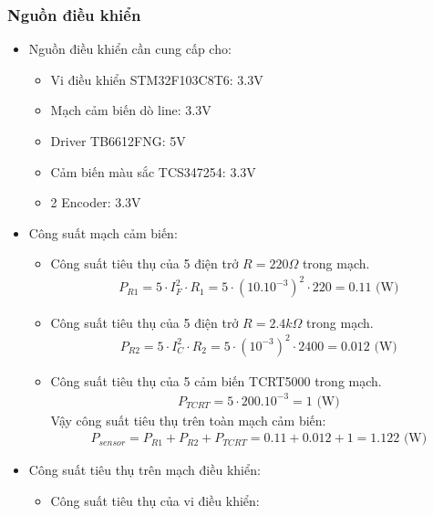             \subsubsection{Nguồn điều khiển}
                \begin{itemize}
                    \item Nguồn điều khiển cần cung cấp cho:
                    \begin{itemize}
                        \item Vi điều khiển STM32F103C8T6: 3.3V
                        \item Mạch cảm biến dò line: 3.3V
                        \item Driver TB6612FNG: 5V
                        \item Cảm biến màu sắc TCS347254: 3.3V
                        \item 2 Encoder: 3.3V
                    \end{itemize}
                    \item Công suất mạch cảm biến:
                    \begin{itemize}
                        \item Công suất tiêu thụ của 5 điện trở $R = 220 \Omega$ trong mạch. \\
                        \begin{align*}
                            P_{R1} = 5 \cdot I_{F}^2 \cdot R_1 = 5 \cdot (10.10^{-3})^2 \cdot 220 = 0.11 \text{ (W)}
                        \end{align*}
                        \item Công suất tiêu thụ của 5 điện trở $R = 2.4 k\Omega$ trong mạch. \\
                        \begin{align*}
                            P_{R2} = 5 \cdot I_{C}^2 \cdot R_2 = 5 \cdot (10^{-3})^2 \cdot 2400 = 0.012  \text{ (W)}
                        \end{align*}
                        \item Công suất tiêu thụ của 5 cảm biến TCRT5000 trong mạch. \\
                        \begin{align*}
                            P_{TCRT} = 5 \cdot 200.10^{-3} = 1 \text{ (W)}
                        \end{align*}
                        Vậy công suất tiêu thụ trên toàn mạch cảm biến:
                        \begin{align*}
                            P_{sensor} = P_{R1} + P_{R2} + P_{TCRT} = 0.11 + 0.012 + 1 = 1.122 \text{ (W)}
                        \end{align*}
                    \end{itemize}
                    \item Công suất tiêu thụ trên mạch điều khiển:
                    \begin{itemize}
                        \item Công suất tiêu thụ của vi điều khiển:
                        
                    \end{itemize}
                \end{itemize}